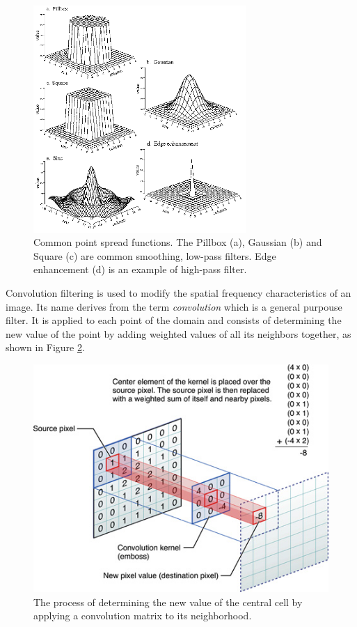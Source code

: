  \begin{figure}
	\begin{center}
		\includegraphics[width=0.72\textwidth]{./images/opencal/kernel_functions}
		\caption{Common point spread functions. The Pillbox (a), Gaussian (b) and Square (c) are common smoothing, low-pass filters. Edge enhancement (d) is an example of high-pass filter. }
		\label{fig:kernel_functions}
	\end{center}
\end{figure}
Convolution filtering is used to modify the spatial frequency
characteristics of an image. Its name derives from the term \textit{convolution} which is a general purpouse filter. It is applied to each  point of the domain and consists of determining the new value of the point  by adding weighted values of all its neighbors together, as shown in Figure \ref{fig:convolution}.
 \begin{figure}
	\begin{center}
		\includegraphics[width=1.0\textwidth]{./images/opencal/kernel_convolution}
		\caption{The process of determining the new value of the central cell by applying a convolution matrix to its neighborhood.}
		\label{fig:convolution}
	\end{center}
\end{figure}
